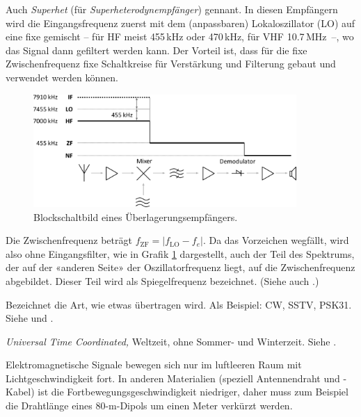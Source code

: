 {Auch \textit{Superhet} (für \textit{Superheterodynempfänger}) gennant. In diesen Empfängern wird die Eingangsfrequenz zuerst mit dem (anpassbaren) Lokaloszillator (LO) auf eine fixe  gemischt -- für HF meist 455\,kHz oder 470\,kHz, für VHF 10.7\,MHz~--, wo das Signal dann gefiltert werden kann. Der Vorteil ist, dass für die fixe Zwischenfrequenz fixe Schaltkreise für Verstärkung und Filterung gebaut und verwendet werden können.

\begin{figure}[h!]
 \centering
 \includegraphics[width=10cm]{./png/Superhet.png}
 \caption{Blockschaltbild eines Überlagerungsempfängers.}
 \label{fig:superhet}
\end{figure}

Die Zwischenfrequenz beträgt $f_\mathrm{ZF} = \left| f_\mathrm{LO} - f_e \right|$. Da das Vorzeichen wegfällt, wird also ohne Eingangsfilter, wie in Grafik \ref{fig:superhet} dargestellt, auch der Teil des Spektrums, der auf der «anderen Seite» der Oszillatorfrequenz liegt, auf die Zwischenfrequenz abgebildet. Dieser Teil wird als Spiegelfrequenz bezeichnet. (Siehe auch .)

}

{Bezeichnet die Art, wie etwas übertragen wird. Als Beispiel: CW, SSTV, PSK31. Siehe  und .}

{\textit{Universal Time Coordinated,} Weltzeit, ohne Sommer- und Winterzeit. Siehe .}

{Elektromagnetische Signale bewegen sich nur im luftleeren Raum mit Lichtgeschwindigkeit fort. In anderen Materialien (speziell Antennendraht und -Kabel) ist die Fortbewegungsgeschwindigkeit niedriger, daher muss zum Beispiel die Drahtlänge eines 80-m-Dipols um einen Meter verkürzt werden.
}

